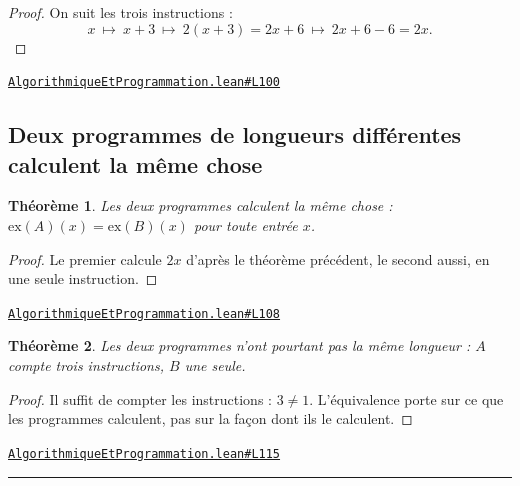 \documentclass[11pt,a4paper]{article}
\theoremstyle{definition}
\theoremstyle{plain}
\newtheorem{theoreme}{Théorème}
\newcommand{\source}[2]{\par\smallskip\noindent\hfill{\footnotesize\href{#1}{\texttt{#2}}}\par\smallskip}
\begin{document}
\begin{proof}
On suit les trois instructions :
\[ x \ \longmapsto\ x + 3 \ \longmapsto\ 2(x+3) = 2x + 6 \ \longmapsto\ 2x + 6 - 6 = 2x . \]
\end{proof}
\source{https://github.com/Commutator-IO/learn-lean/blob/main/courses/01-college/07-algorithmique-et-programmation/AlgorithmiqueEtProgrammation.lean\#L100}{AlgorithmiqueEtProgrammation.lean\#L100}

\subsection{Deux programmes de longueurs différentes calculent la même chose}

\begin{theoreme}
Les deux programmes calculent la même chose :
$\mathrm{ex}(A)(x) = \mathrm{ex}(B)(x)$ pour toute entrée $x$.
\end{theoreme}

\begin{proof}
Le premier calcule $2x$ d'après le théorème précédent, le second aussi, en une seule
instruction.
\end{proof}
\source{https://github.com/Commutator-IO/learn-lean/blob/main/courses/01-college/07-algorithmique-et-programmation/AlgorithmiqueEtProgrammation.lean\#L108}{AlgorithmiqueEtProgrammation.lean\#L108}

\begin{theoreme}
Les deux programmes n'ont pourtant pas la même longueur : $A$ compte trois
instructions, $B$ une seule.
\end{theoreme}

\begin{proof}
Il suffit de compter les instructions : $3 \ne 1$. L'équivalence porte sur ce que les
programmes calculent, pas sur la façon dont ils le calculent.
\end{proof}
\source{https://github.com/Commutator-IO/learn-lean/blob/main/courses/01-college/07-algorithmique-et-programmation/AlgorithmiqueEtProgrammation.lean\#L115}{AlgorithmiqueEtProgrammation.lean\#L115}

\vfill
\noindent\rule{0.35\linewidth}{0.4pt}\par
{}
\end{document}
